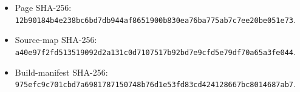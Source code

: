 \begin{itemize}
\tightlist
\item
  Page SHA-256: \texttt{1\allowbreak{}2\allowbreak{}b\allowbreak{}9\allowbreak{}0\allowbreak{}1\allowbreak{}8\allowbreak{}4\allowbreak{}b\allowbreak{}4\allowbreak{}e\allowbreak{}2\allowbreak{}3\allowbreak{}8\allowbreak{}b\allowbreak{}c\allowbreak{}6\allowbreak{}b\allowbreak{}d\allowbreak{}7\allowbreak{}d\allowbreak{}b\allowbreak{}9\allowbreak{}4\allowbreak{}4\allowbreak{}a\allowbreak{}f\allowbreak{}8\allowbreak{}6\allowbreak{}5\allowbreak{}1\allowbreak{}9\allowbreak{}0\allowbreak{}0\allowbreak{}b\allowbreak{}8\allowbreak{}3\allowbreak{}0\allowbreak{}e\allowbreak{}a\allowbreak{}7\allowbreak{}6\allowbreak{}b\allowbreak{}a\allowbreak{}7\allowbreak{}7\allowbreak{}5\allowbreak{}a\allowbreak{}b\allowbreak{}7\allowbreak{}c\allowbreak{}7\allowbreak{}e\allowbreak{}e\allowbreak{}2\allowbreak{}0\allowbreak{}b\allowbreak{}e\allowbreak{}0\allowbreak{}5\allowbreak{}1\allowbreak{}e\allowbreak{}7\allowbreak{}3}.
\item
  Source-map SHA-256: \texttt{a\allowbreak{}4\allowbreak{}0\allowbreak{}e\allowbreak{}9\allowbreak{}7\allowbreak{}f\allowbreak{}2\allowbreak{}f\allowbreak{}d\allowbreak{}5\allowbreak{}1\allowbreak{}3\allowbreak{}5\allowbreak{}1\allowbreak{}9\allowbreak{}0\allowbreak{}9\allowbreak{}2\allowbreak{}d\allowbreak{}2\allowbreak{}a\allowbreak{}1\allowbreak{}3\allowbreak{}1\allowbreak{}c\allowbreak{}0\allowbreak{}d\allowbreak{}7\allowbreak{}1\allowbreak{}0\allowbreak{}7\allowbreak{}5\allowbreak{}1\allowbreak{}7\allowbreak{}b\allowbreak{}9\allowbreak{}2\allowbreak{}b\allowbreak{}d\allowbreak{}7\allowbreak{}e\allowbreak{}9\allowbreak{}c\allowbreak{}f\allowbreak{}d\allowbreak{}5\allowbreak{}e\allowbreak{}7\allowbreak{}9\allowbreak{}d\allowbreak{}f\allowbreak{}7\allowbreak{}0\allowbreak{}a\allowbreak{}6\allowbreak{}5\allowbreak{}a\allowbreak{}3\allowbreak{}f\allowbreak{}e\allowbreak{}0\allowbreak{}4\allowbreak{}4}.
\item
  Build-manifest SHA-256: \texttt{9\allowbreak{}7\allowbreak{}5\allowbreak{}e\allowbreak{}f\allowbreak{}c\allowbreak{}9\allowbreak{}c\allowbreak{}7\allowbreak{}0\allowbreak{}1\allowbreak{}c\allowbreak{}b\allowbreak{}d\allowbreak{}7\allowbreak{}a\allowbreak{}6\allowbreak{}9\allowbreak{}8\allowbreak{}1\allowbreak{}7\allowbreak{}8\allowbreak{}7\allowbreak{}1\allowbreak{}5\allowbreak{}0\allowbreak{}7\allowbreak{}4\allowbreak{}8\allowbreak{}b\allowbreak{}7\allowbreak{}6\allowbreak{}d\allowbreak{}1\allowbreak{}e\allowbreak{}5\allowbreak{}3\allowbreak{}f\allowbreak{}d\allowbreak{}8\allowbreak{}3\allowbreak{}c\allowbreak{}d\allowbreak{}4\allowbreak{}2\allowbreak{}4\allowbreak{}1\allowbreak{}2\allowbreak{}8\allowbreak{}6\allowbreak{}6\allowbreak{}7\allowbreak{}b\allowbreak{}c\allowbreak{}8\allowbreak{}0\allowbreak{}1\allowbreak{}4\allowbreak{}6\allowbreak{}8\allowbreak{}7\allowbreak{}a\allowbreak{}b\allowbreak{}7}.
\end{itemize}

